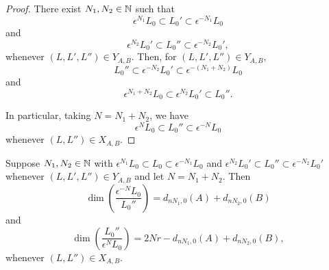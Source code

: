 \documentclass[a4paper, 11pt]{report}
\begin{document}
\begin{proof}
There exist $N_1,N_2\in\mathbb{N}$ such that
\begin{equation*}
\epsilon^{N_1}L_0\subset L_0'\subset \epsilon^{-N_1}L_0
\end{equation*}
and
\begin{equation*}
\epsilon^{N_2}L_0'\subset L_0''\subset \epsilon^{-N_2}L_0',
\end{equation*}
whenever $(L,L',L'')\in Y_{A,B}$. Then, for $(L,L',L'')\in Y_{A,B}$,
\begin{equation*}
L_0''\subset \epsilon^{-N_2} L_0' \subset \epsilon^{-(N_1+N_2)} L_0
\end{equation*}
and
\begin{equation*}
\epsilon^{N_1+N_2}L_0\subset \epsilon^{N_2}L_0'\subset L_0''.
\end{equation*}

In particular, taking $N=N_1 + N_2$, we have
\begin{equation*}
\epsilon^N L_0 \subset L_0'' \subset \epsilon^{-N}L_0
\end{equation*}
whenever $(L,L'')\in X_{A,B}$.
\end{proof}

\begin{lemma}\label{lemma:codimensions-in-orbit-product}
Suppose $N_1,N_2\in\mathbb{N}$ with $\epsilon^{N_1}L_0\subset L_0\subset \epsilon^{-N_1}L_0$ and $\epsilon^{N_2}L_0'\subset L_0''\subset \epsilon^{-N_2}L_0'$ whenever $(L,L',L'')\in Y_{A,B}$ and let $N = N_1 + N_2$. Then
\begin{equation*}
\dim\left(\frac{\epsilon^{-N}L_0}{L_0''}\right) = d_{nN_1,0}(A) + d_{nN_2,0}(B)
\end{equation*}
and
\begin{equation*}
\dim\left(\frac{L_0''}{\epsilon^N L_0}\right) = 2Nr - d_{nN_1,0}(A) + d_{nN_2,0}(B),
\end{equation*}
whenever $(L,L'')\in X_{A,B}$.
\end{lemma}
\end{document}
